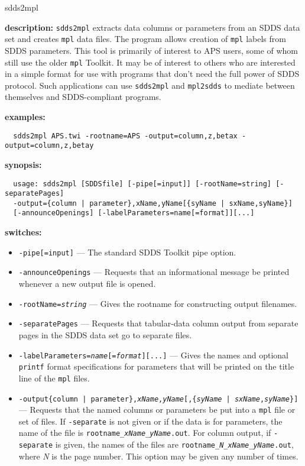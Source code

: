 \begin{sddsprog}{sdds2mpl}
\item \textbf{description:}
  \verb|sdds2mpl| extracts data columns or parameters from an SDDS data set and creates \verb|mpl| data files. The
  program allows creation of \verb|mpl| labels from SDDS parameters. This tool is primarily of interest to APS
  users, some of whom still use the older {\tt mpl} Toolkit. It may be of interest to others who are interested in
  a simple format for use with programs that don't need the full power of SDDS protocol. Such applications can use
  {\tt sdds2mpl} and {\tt mpl2sdds} to mediate between themselves and SDDS-compliant programs.

\item \textbf{examples:}
  \begin{verbatim}
  sdds2mpl APS.twi -rootname=APS -output=column,z,betax -output=column,z,betay
  \end{verbatim}

\item \textbf{synopsis:}
  \begin{verbatim}
  usage: sdds2mpl [SDDSfile] [-pipe[=input]] [-rootName=string] [-separatePages]
  -output={column | parameter},xName,yName[{syName | sxName,syName}]
  [-announceOpenings] [-labelParameters=name[=format]][...]
  \end{verbatim}

\item \textbf{switches:}
  \begin{itemize}
  \item \verb|-pipe[=input]| --- The standard SDDS Toolkit pipe option.
  \item \verb|-announceOpenings| --- Requests that an informational message be printed whenever a new output file is opened.
  \item {\tt -rootName={\em string}} --- Gives the rootname for constructing output filenames.
  \item \verb|-separatePages| --- Requests that tabular-data column output from separate pages in the SDDS data set go to separate files.
  \item {\tt -labelParameters={\em name}[={\em format}][...]} --- Gives the names and optional \verb|printf| format specifications for parameters that will be printed on the title line of the \verb|mpl| files.
  \item {\tt -output\{column | parameter\},{\em xName},{\em yName}[,\{{\em syName} | {\em sxName},{\em syName}\}]} --- Requests that the named columns or parameters be put into a \verb|mpl| file or set of files. If \verb|-separate| is not given or if the data is for parameters, the name of the file is {\tt rootname\_{\em xName}\_{\em yName}.out}. For column output, if \verb|-separate| is given, the names of the files are {\tt rootname\_{\em N}\_{\em xName}\_{\em yName}.out}, where {\em N} is the page number. This option may be given any number of times.
  \end{itemize}


\end{sddsprog}
